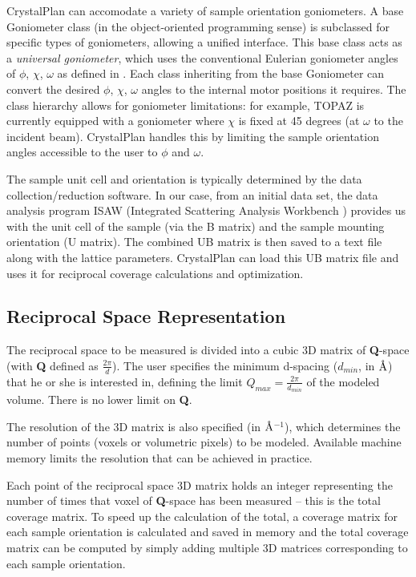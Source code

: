 \documentclass[final]{iucr}              %
\newcommand{\ang}{$\mathrm{\AA} $}
\begin{document}
CrystalPlan can accomodate a variety of sample
orientation goniometers. A base Goniometer class (in the object-oriented
programming sense) is subclassed for specific types of goniometers, allowing a
unified interface. This base class acts as a \emph{universal goniometer},
which uses the conventional Eulerian goniometer angles of
$\phi$, $\chi$, $\omega$ as defined in \cite{busing67}.
Each class inheriting from the base Goniometer can convert
the desired $\phi$, $\chi$, $\omega$ angles to the internal motor positions it requires. 
The class hierarchy allows for goniometer limitations: for example, TOPAZ is
currently equipped with a goniometer where $\chi$ is fixed at 45 degrees
(at $\omega$ to the incident beam). CrystalPlan handles this by limiting the
sample orientation angles accessible to the user to $\phi$ and $\omega$.
    
The sample unit cell and orientation is typically determined by the data
collection/reduction software. In our case, from an initial data set, the data
analysis program ISAW (Integrated Scattering Analysis
Workbench \cite{Mikkelson05}) provides us with the unit cell of the sample (via
the B matrix) and the sample mounting orientation (U matrix).
The combined UB matrix is then saved to a
text file along with the lattice parameters. 
CrystalPlan can load this UB matrix file and uses it for reciprocal coverage
calculations and optimization.
    
  
\subsection{Reciprocal Space Representation}

The reciprocal space to be measured is divided into a cubic 3D matrix 
of {\bf Q}-space (with {\bf Q} defined as $\frac{2\pi}{d}$). 
The user specifies the minimum d-spacing ($d_{min}$, in \ang) 
that he or she is interested in, defining the limit
$Q_{max} = \frac{2\pi}{d_{min}}$ of the modeled volume. There is no lower limit
on {\bf Q}.

The resolution of the 3D matrix is also specified
(in \ang$^{-1}$), which determines the number of points (voxels or volumetric pixels) to be modeled. Available machine memory
limits the resolution that can be achieved in practice.

Each point of the reciprocal space 3D matrix holds an integer representing the 
number of times that voxel of {\bf Q}-space has
been measured -- this is the total coverage matrix. To speed up the
calculation of the total, a coverage matrix for each sample orientation is 
calculated and saved in memory and the total coverage
matrix can be computed by simply adding multiple 3D matrices corresponding to each sample orientation. 
 
\end{document}

